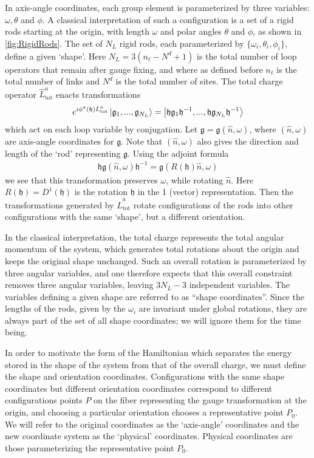 \documentclass[reprint,superscriptaddress,pra,nofootinbib,preprintnumbers,floatfix]{revtex4-1}
\providecommand{\g}{{\mathfrak{g}}}
\providecommand{\h}{{\mathfrak{h}}}
\begin{document}
In axis-angle coordinates, each group element is parameterized by three variables: $\omega, \theta$ and $\phi$. 
%
A classical interpretation of such a configuration is a set of a rigid rods starting at the origin, with length $\omega$ and  polar angles $\theta$ and $\phi$, as shown in \cref{fig:RigidRods}.
%
The set of $N_L$ rigid rods, each parameterized by $\{\omega_i, \theta_i, \phi_i\}$, define a given `shape'. Here $N_L = 3(n_\ell - N^d + 1)$ is the total number of loop operators that remain after gauge fixing, and where as defined before $n_\ell$ is the total number of links and $N^d$ is the total number of sites. 
%
The total charge operator $\hat{L}_{\text{tot}}^a$ enacts transformations
%
\begin{align}
    e^{i\phi^a(\h) \hat{L}^a_{\text{tot}}}\ket{\g_1,...,\g_{N_L}} = \ket{\h\g_1\h^{-1},...,\h\g_{N_L}\h^{-1}}
\end{align}
%
which act on each loop variable by conjugation. Let $\g = \g(\hat{n},\omega)$, where $(\hat{n},\omega)$ are axis-angle coordinates for $\g$. Note that $(\hat{n},\omega)$ also gives the direction and length of the `rod' representing $\g$. Using the adjoint formula
%
\begin{align}
    \h \g(\hat{n},\omega) \h^{-1} = \g( R(\h)\hat{n},\omega)
\end{align}
%
we see that this transformation preserves $\omega$, while rotating $\hat{n}$. Here $R(\h) = D^{1}(\h)$ is the rotation $\h$ in the 1 (vector) representation. 
%
Then the transformations generated by $\hat{L}^a_{\text{tot}}$ rotate configurations of the rods into other configurations with the same `shape', but a different orientation. 

In the classical interpretation, the total charge represents the total angular momentum of the system, which generates total rotations about the origin and keeps the original shape unchanged.
%
Such an overall rotation is parameterized by three angular variables, and one therefore expects that this overall constraint removes three angular variables, leaving $3N_L-3$ independent variables. The variables defining a given shape are referred to as ``shape coordinates''.
%
Since the lengths of the rods, given by the $\omega_i$ are invariant under global rotations, they are always part of the set of all shape coordinates; we will ignore them for the time being. 

In order to motivate the form of the Hamiltonian which separates the energy stored in the shape of the system from that of the overall charge, we must define the shape and orientation coordinates. 
%
Configurations with the same shape coordinates but different orientation coordinates correspond to different configurations points $P$ on the fiber representing the gauge transformation at the origin, and choosing a particular orientation chooses a representative point $P_0$.
%
We will refer to the original coordinates as the `axis-angle' coordinates and the new coordinate system as the `physical' coordinates.
%
Physical coordinates are those parameterizing the representative point $P_0$.
\end{document}
